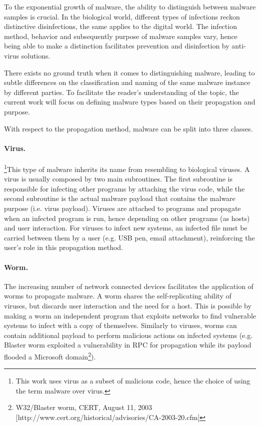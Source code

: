 To the exponential growth of malware\cite{av-test:report}, the ability to distinguish between malware samples is crucial. In the biological world, different types of infections reckon distinctive disinfections, the same applies to the digital world. The infection method, behavior and subsequently purpose of malware samples vary, hence being able to make a distinction facilitates prevention and disinfection by anti-virus solutions.

There exists no ground truth when it comes to distinguishing malware, leading to subtle differences on the classification and naming of the same malware instance by different parties. To facilitate the reader's understanding of the topic, the current work will focus on defining malware types based on their propagation and purpose.

With respect to the propagation method, malware can be split into three classes\cite{kolter:learning}.

\paragraph{Virus.}\footnote{This work uses virus as a subset of malicious code, hence the choice of using the term malware over virus.}This type of malware inherits its name from resembling to biological viruses. A virus is usually composed by two main subroutines. The first subroutine is responsible for infecting other programs by attaching the virus code, while the second subroutine is the actual malware payload that contains the malware purpose (i.e. virus payload)\cite{chen:evolution}. Viruses are attached to programs and propagate when an infected program is run, hence depending on other programs (as hosts) and user interaction. For viruses to infect new systems, an infected file must be carried between them by a user (e.g. USB pen, email attachment), reinforcing the user's role in this propagation method.

\paragraph{Worm.} The increasing number of network connected devices facilitates the application of worms to propagate malware. A worm shares the self-replicating ability of viruses, but discards user interaction and the need for a host. This is possible by making a worm an independent program that exploits networks to find vulnerable systems to infect with a copy of themselves\cite{chen:evolution}. Similarly to viruses, worms can contain additional payload to perform malicious actions on infected systems (e.g. Blaster worm exploited a vulnerability in RPC for propagation while its payload flooded a Microsoft domain\footnote{W32/Blaster worm, CERT, August 11, 2003 [http://www.cert.org/historical/advisories/CA-2003-20.cfm]}).

